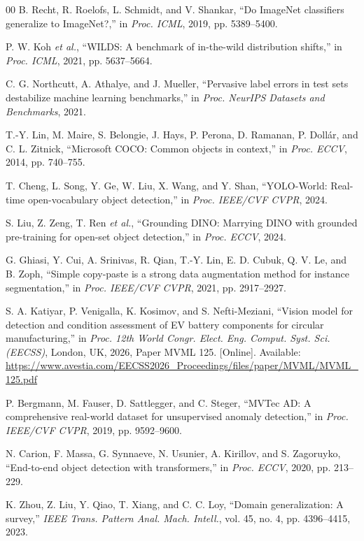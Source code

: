 \documentclass[conference]{IEEEtran}
\begin{document}
\begin{thebibliography}{00}
 B. Recht, R. Roelofs, L. Schmidt, and V. Shankar, ``Do
ImageNet classifiers generalize to ImageNet?,'' in \emph{Proc. ICML}, 2019,
pp. 5389--5400.

 P. W. Koh \emph{et al.}, ``WILDS: A benchmark of
in-the-wild distribution shifts,'' in \emph{Proc. ICML}, 2021, pp. 5637--5664.

 C. G. Northcutt, A. Athalye, and J. Mueller, ``Pervasive
label errors in test sets destabilize machine learning benchmarks,'' in
\emph{Proc. NeurIPS Datasets and Benchmarks}, 2021.

 T.-Y. Lin, M. Maire, S. Belongie, J. Hays, P. Perona,
D. Ramanan, P. Doll\'ar, and C. L. Zitnick, ``Microsoft COCO: Common objects in
context,'' in \emph{Proc. ECCV}, 2014, pp. 740--755.

 T. Cheng, L. Song, Y. Ge, W. Liu, X. Wang, and Y. Shan,
``YOLO-World: Real-time open-vocabulary object detection,'' in \emph{Proc. IEEE/CVF
CVPR}, 2024.

 S. Liu, Z. Zeng, T. Ren \emph{et al.}, ``Grounding DINO:
Marrying DINO with grounded pre-training for open-set object detection,'' in
\emph{Proc. ECCV}, 2024.

 G. Ghiasi, Y. Cui, A. Srinivas, R. Qian, T.-Y. Lin,
E. D. Cubuk, Q. V. Le, and B. Zoph, ``Simple copy-paste is a strong data augmentation
method for instance segmentation,'' in \emph{Proc. IEEE/CVF CVPR}, 2021,
pp. 2917--2927.

 S. A. Katiyar, P. Venigalla, K. Kosimov, and
S. Nefti-Meziani, ``Vision model for detection and condition assessment of EV
battery components for circular manufacturing,'' in \emph{Proc. 12th World Congr.
Elect. Eng. Comput. Syst. Sci. (EECSS)}, London, UK, 2026, Paper MVML 125.
[Online]. Available: \url{https://www.avestia.com/EECSS2026_Proceedings/files/paper/MVML/MVML_125.pdf}

 P. Bergmann, M. Fauser, D. Sattlegger, and C. Steger,
``MVTec AD: A comprehensive real-world dataset for unsupervised anomaly
detection,'' in \emph{Proc. IEEE/CVF CVPR}, 2019, pp. 9592--9600.

 N. Carion, F. Massa, G. Synnaeve, N. Usunier,
A. Kirillov, and S. Zagoruyko, ``End-to-end object detection with transformers,''
in \emph{Proc. ECCV}, 2020, pp. 213--229.

 K. Zhou, Z. Liu, Y. Qiao, T. Xiang, and C. C. Loy, ``Domain
generalization: A survey,'' \emph{IEEE Trans. Pattern Anal. Mach. Intell.},
vol. 45, no. 4, pp. 4396--4415, 2023.


\end{thebibliography}
\end{document}

